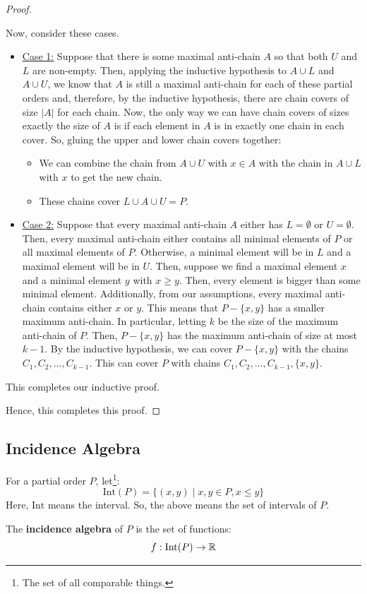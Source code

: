\documentclass[letterpaper]{article}
\begin{document}
\begin{proof}
\begin{itemize}
        Now, consider these cases.
        \begin{itemize}
            \item \underline{Case 1:} Suppose that there is some maximal anti-chain $A$ so that both $U$ and $L$ are non-empty. Then, applying the inductive hypothesis to $A \cup L$ and $A \cup U$, we know that $A$ is still a maximal anti-chain for each of these partial orders and, therefore, by the inductive hypothesis, there are chain covers of size $|A|$ for each chain. Now, the only way we can have chain covers of sizes exactly the size of $A$ is if each element in $A$ is in exactly one chain in each cover. So, gluing the upper and lower chain covers together:
            \begin{itemize}
                \item We can combine the chain from $A \cup U$ with $x \in A$ with the chain in $A \cup L$ with $x$ to get the new chain. 
                \item These chains cover $L \cup A \cup U = P$.
            \end{itemize}

            \item \underline{Case 2:} Suppose that every maximal anti-chain $A$ either has $L = \emptyset$ or $U = \emptyset$. Then, every maximal anti-chain either contains all minimal elements of $P$ or all maximal elements of $P$. Otherwise, a minimal element will be in $L$ and a maximal element will be in $U$. Then, suppose we find a maximal element $x$ and a minimal element $y$ with $x \geq y$. Then, every element is bigger than some minimal element. Additionally, from our assumptions, every maximal anti-chain contains either $x$ or $y$. This means that $P - \{x, y\}$ has a smaller maximum anti-chain. In particular, letting $k$ be the size of the maximum anti-chain of $P$. Then, $P - \{x, y\}$ has the maximum anti-chain of size at most $k - 1$. By the inductive hypothesis, we can cover $P - \{x, y\}$ with the chains $C_1, C_2, \dots, C_{k - 1}$. This can cover $P$ with chains $C_1, C_2, \dots, C_{k - 1}, \{x, y\}$. 
        \end{itemize}
        This completes our inductive proof.
    \end{itemize}
    Hence, this completes this proof. \qedhere
\end{proof}

\subsection{Incidence Algebra}
\begin{definition}{}{}
    For a partial order $P$, let\footnote{The set of all comparable things.}:
    \[\text{Int}(P) = \{(x, y) \mid x, y \in P, x \leq y\}\]
    Here, $\text{Int}$ means the interval. So, the above means the set of intervals of $P$. 
\end{definition}
The \textbf{incidence algebra} of $P$ is the set of functions:
\[f: \text{Int}(P) \to \mathbb{R}\]
\end{document}
